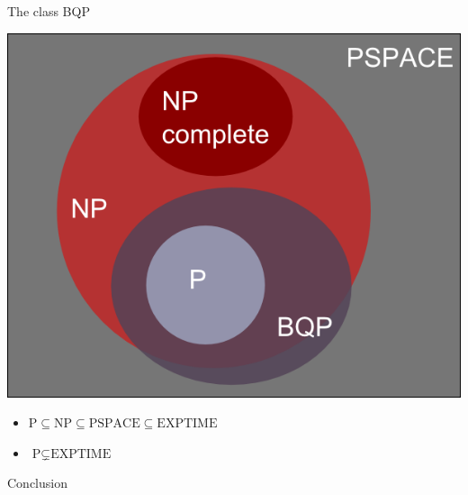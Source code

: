 \documentclass[c]{beamer}
\begin{document}
\begin{frame}{The class BQP}

\begin{center}
\includegraphics[scale=0.20]{images/classes.png} 	
\end{center}

\begin{itemize}
\item $\mbox{P} \subseteq \mbox{NP}  \subseteq \mbox{PSPACE} \subseteq \mbox{EXPTIME} $

\item $\mbox{P} \subsetneq \mbox{EXPTIME}$
	\end{itemize}
	
\end{frame}

\begin{frame}{Conclusion}

	
	
\end{frame}
\end{document}
